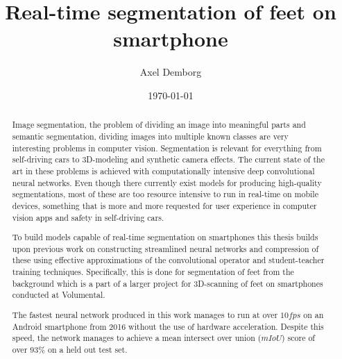 \documentclass{kththesis}
\title{Real-time segmentation of feet on smartphone}
\author{Axel Demborg}
\date{\today}
\begin{document}
\listoftodos

\frontmatter

\titlepage

\begin{abstract}

  Image segmentation, the problem of dividing an image into meaningful parts and
  semantic segmentation, dividing images into multiple known classes are 
  very interesting problems in computer vision. Segmentation is relevant for
  everything from self-driving cars to 3D-modeling and synthetic camera effects.
  The current state of the art in these problems is achieved with computationally
  intensive deep convolutional neural networks.
  Even though there currently exist models for producing high-quality
  segmentations, most of these are too resource intensive to run in real-time on
  mobile devices, something that is more and more requested for user experience
  in computer vision apps and safety in self-driving cars.
  
  To build models capable of real-time segmentation on smartphones this thesis
  builds upon previous work on constructing streamlined neural networks and compression of these using
  effective approximations of the convolutional operator and student-teacher
  training techniques. Specifically, this is
  done for segmentation of feet from the background which is a part of a larger
  project for 3D-scanning of feet on smartphones conducted at Volumental.

  The fastest neural network produced in this work manages to run at over \(10
  fps\) on an Android smartphone from 2016 without the use of hardware
  acceleration. Despite this speed, the network manages to achieve a mean
  intersect over union (\(mIoU\)) score of over \(93\%\) on a held out test set.

\end{abstract}
\end{document}
